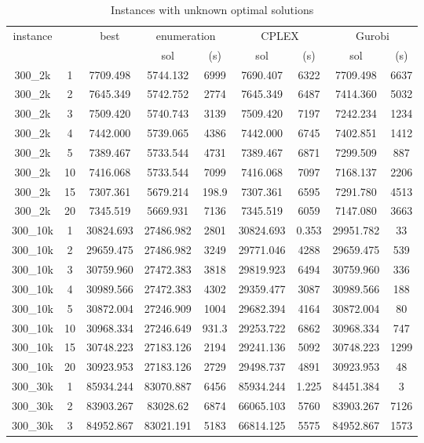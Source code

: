 \documentclass[10pt]{article}
\begin{document}
\begin{table}[h]\footnotesize
\caption{Instances with unknown optimal solutions}
	\centering
\begin{tabular}{ccc|cc|cc|cc}
\hline 
\multirow{2}{*}{{instance}} & \multirow{2}{*}{{}} & \multirow{2}{*}{{best}} & \multicolumn{2}{c|}{{enumeration}} & \multicolumn{2}{c|}{{CPLEX}} & \multicolumn{2}{c}{{Gurobi}}\tabularnewline
\cline{4-9} 
 &  &  & {sol} & { (s)} & {sol} & { (s)} & {sol} & { (s)}\tabularnewline
\hline 
{300\_2k} & {1} & {7709.498} & {5744.132} & {6999} & {7690.407} & {6322} & {7709.498} & {6637}\tabularnewline
{300\_2k} & {2} & {7645.349} & {5742.752} & {2774} & {7645.349} & {6487} & {7414.360} & {5032}\tabularnewline
{300\_2k} & {3} & {7509.420} & {5740.743} & {3139} & {7509.420} & {7197} & {7242.234} & {1234}\tabularnewline
{300\_2k} & {4} & {7442.000} & {5739.065} & {4386} & {7442.000} & {6745} & {7402.851} & {1412}\tabularnewline
{300\_2k} & {5} & {7389.467} & {5733.544} & {4731} & {7389.467} & {6871} & {7299.509} & {887}\tabularnewline
{300\_2k} & {10} & {7416.068} & {5733.544} & {7099} & {7416.068} & {7097} & {7168.137} & {2206}\tabularnewline
{300\_2k} & {15} & {7307.361} & {5679.214} & {198.9} & {7307.361} & {6595} & {7291.780} & {4513}\tabularnewline
{300\_2k} & {20} & {7345.519} & {5669.931} & {7136} & {7345.519} & {6059} & {7147.080} & {3663}\tabularnewline
\hline 
{300\_10k} & {1} & {30824.693} & {27486.982} & {2801} & {30824.693} & {0.353} & {29951.782} & {33}\tabularnewline
{300\_10k} & {2} & {29659.475} & {27486.982} & {3249} & {29771.046} & {4288} & {29659.475} & {539}\tabularnewline
{300\_10k} & {3} & {30759.960} & {27472.383} & {3818} & {29819.923} & {6494} & {30759.960} & {336}\tabularnewline
{300\_10k} & {4} & {30989.566} & {27472.383} & {4302} & {29359.477} & {3087} & {30989.566} & {188}\tabularnewline
{300\_10k} & {5} & {30872.004} & {27246.909} & {1004} & {29682.394} & {4164} & {30872.004} & {80}\tabularnewline
{300\_10k} & {10} & {30968.334} & {27246.649} & {931.3} & {29253.722} & {6862} & {30968.334} & {747}\tabularnewline
{300\_10k} & {15} & {30748.223} & {27183.126} & {2194} & {29241.136} & {5092} & {30748.223} & {1299}\tabularnewline
{300\_10k} & {20} & {30923.953} & {27183.126} & {2729} & {29498.737} & {4891} & {30923.953} & {48}\tabularnewline
\hline 
{300\_30k} & {1} & {85934.244} & {83070.887} & {6456} & {85934.244} & {1.225} & {84451.384} & {3}\tabularnewline
{300\_30k} & {2} & {83903.267} & {83028.62} & {6874} & {66065.103} & {5760} & {83903.267} & {7126}\tabularnewline
{300\_30k} & {3} & {84952.867} & {83021.191} & {5183} & {66814.125} & {5575} & {84952.867} & {1573}\tabularnewline

\end{tabular}
\end{table}
\end{document}
